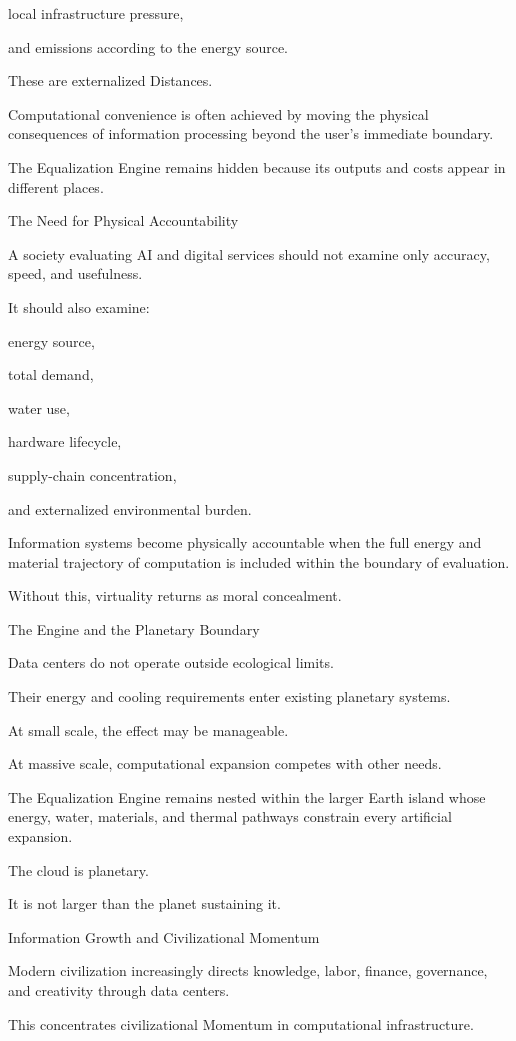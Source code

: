 local infrastructure pressure,

and emissions according to the energy source.

These are externalized Distances.

Computational convenience is often achieved by moving the physical consequences of information processing beyond the user’s immediate boundary.

The Equalization Engine remains hidden because its outputs and costs appear in different places.

The Need for Physical Accountability

A society evaluating AI and digital services should not examine only accuracy, speed, and usefulness.

It should also examine:

energy source,

total demand,

water use,

hardware lifecycle,

supply-chain concentration,

and externalized environmental burden.

Information systems become physically accountable when the full energy and material trajectory of computation is included within the boundary of evaluation.

Without this, virtuality returns as moral concealment.

The Engine and the Planetary Boundary

Data centers do not operate outside ecological limits.

Their energy and cooling requirements enter existing planetary systems.

At small scale, the effect may be manageable.

At massive scale, computational expansion competes with other needs.

The Equalization Engine remains nested within the larger Earth island whose energy, water, materials, and thermal pathways constrain every artificial expansion.

The cloud is planetary.

It is not larger than the planet sustaining it.

Information Growth and Civilizational Momentum

Modern civilization increasingly directs knowledge, labor, finance, governance, and creativity through data centers.

This concentrates civilizational Momentum in computational infrastructure.

